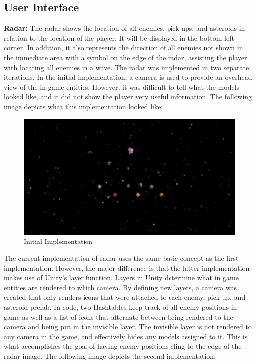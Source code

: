\documentclass[12pt]{article}       %
\begin{document}
\subsection{User Interface} %

	{\bf Radar:} The radar shows the location of all enemies, pick-ups, and asteroids in relation to the location of the player. It will be displayed in the bottom left corner. In addition, it also represents the direction of all enemies not shown in the immediate area with a symbol on the edge of the radar, assisting the player with locating all enemies in a wave. The radar was implemented in two separate iterations. In the initial implementation, a camera is used to provide an overhead view of the in game entities. However, it was difficult to tell what the models looked like, and it did not show the player very useful information. The following image depicts what this implementation looked like:

\begin{figure} [H]
\centering
\includegraphics[width=5in]{minimapExample1.png}
\caption{Initial Implementation} \label{RadarOne}
\end{figure}

	The current implementation of radar uses the same basic concept as the first implementation. However, the major difference is that the latter implementation makes use of Unity's layer function. Layers in Unity determine what in game entities are rendered to which camera. By defining new layers, a camera was created that only renders icons that were attached to each enemy, pick-up, and asteroid prefab. In code, two Hashtables keep track of all enemy positions in game as well as a list of icons that alternate between being rendered to the camera and being put in the invisible layer. The invisible layer is not rendered to any camera in the game, and effectively hides any models assigned to it. This is what accomplishes the goal of having enemy positions cling to the edge of the radar image. The following image depicts the second implementation:
\end{document}
